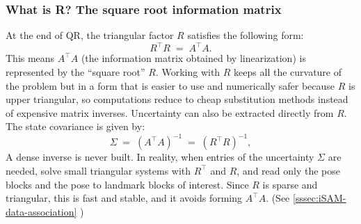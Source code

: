 \subsubsection{What is R? The square root information matrix}
At the end of QR, the triangular factor $R$ satisfies the following form:
$$
R^\top R \;=\; A^\top A .
$$
This means $A^\top A$ (the information matrix obtained by linearization) is represented by the ``square root'' $R$. Working with $R$ keeps all the curvature of the problem but in a form that is easier to use and numerically safer because $R$ is upper triangular, so computations reduce to cheap substitution methods instead of expensive matrix inverses. Uncertainty can also be extracted directly from $R$. The state covariance is given by:
$$
\Sigma \;=\; (A^\top A)^{-1} \;=\; (R^\top R)^{-1},
$$
A dense inverse is never built. In reality, when entries of the uncertainty $\Sigma$ are needed, solve small triangular systems with $R^\top$ and $R$, and read only the pose blocks and the pose to landmark blocks of interest. Since $R$ is sparse and triangular, this is fast and stable, and it avoids forming $A^\top A$. (See \ref{sssec:iSAM-data-association} )




